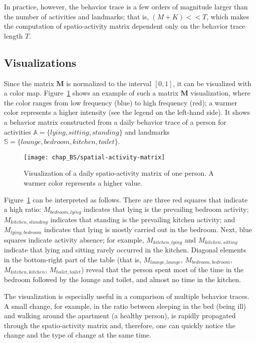 In practice, however, the behavior trace is a few orders of magnitude larger than the number of activities and landmarks; that is, $(M+K) << T$, which makes the computation of spatio-activity matrix dependent only on the behavior trace length $T$.



\subsection{Visualizations}

Since the matrix $\mathbf{M}$ is normalized to the interval $[0, 1]$, it can be visualized with a color map. Figure~\ref{fig:Mmatrix} shows an example of such a matrix $\mathbf{M}$ visualization, where the color ranges from low frequency (blue) to high frequency (red); a warmer color represents a higher intensity (see the legend on the left-hand side). It shows a behavior matrix constructed from a daily behavior trace of a person for activities $\mathbb{A}=\{lying, sitting, standing\}$ and landmarks $\mathbb{S}=\{lounge, bedroom, kitchen, toilet\}$.

\begin{figure}[!ht]
\centering
\texttt{[image: chap\_BS/spatial-activity-matrix]}
\caption{Visualization of a daily spatio-activity matrix of one person. A warmer color represents a higher value.}
\label{fig:Mmatrix}
\end{figure}

Figure~\ref{fig:Mmatrix} can be interpreted as follows. There are three red squares that indicate a high ratio: $M_{bedroom, lying}$ indicates that lying is the prevailing bedroom activity;  $M_{kitchen, standing}$ indicates that standing is the prevailing kitchen activity; and $M_{lying, bedroom}$ indicates that lying is mostly carried out in the bedroom. Next, blue squares indicate activity absence; for example, $M_{kitchen, lying}$ and $M_{kitchen, sitting}$ indicate that lying and sitting rarely occurred in the kitchen. Diagonal elements in the bottom-right part of the table (that is, $M_{lounge, lounge}$, $M_{bedroom, bedroom}$, $M_{kitchen, kitchen}$, $M_{toilet, toilet}$) reveal that the person spent most of the time in the bedroom followed by the lounge and toilet, and almost no time in the kitchen.

The visualization is especially useful in a comparison of multiple behavior traces. A small change, for example, in the ratio between sleeping in the bed (being ill) and walking around the apartment (a healthy person), is rapidly propagated through the spatio-activity matrix and, therefore, one can quickly notice the change and the type of change at the same time.


